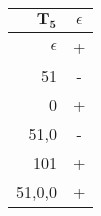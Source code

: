 \begingroup
\scriptsize
\begin{tabular}{r | c}
    $\mathbf{T_5}$ & $\epsilon$ \\ \hline
    $\epsilon$ & + \\
    51 & - \\ \hline
    0 & + \\
    51,0 & - \\
    101 & + \\
    51,0,0 & +
\end{tabular}
\endgroup
